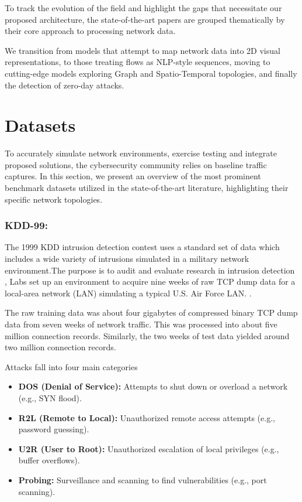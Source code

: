 \documentclass[12pt, a4paper]{report}
\begin{document}
To track the evolution of the field and highlight the gaps that necessitate our proposed architecture, the state-of-the-art papers are grouped thematically by their core approach to processing network data. 

We transition from models that attempt to map network data into 2D visual representations, to those treating flows as NLP-style sequences, moving to cutting-edge models exploring Graph and Spatio-Temporal topologies, and finally the detection of zero-day attacks.

\section{Datasets}

 To accurately simulate network environments, exercise  testing  and  integrate proposed solutions, the cybersecurity community relies on baseline traffic captures. 
 In this section, we present an overview of the most prominent benchmark datasets utilized in the state-of-the-art literature, highlighting their specific network topologies.


\subsubsection{KDD-99:}

  The 1999 KDD intrusion detection contest uses a standard set of data \cite{kddcup99} which includes a wide variety of intrusions simulated in a military network environment.The purpose is to audit  and evaluate research in intrusion detection ,
  Labs set up an environment to acquire nine weeks of raw TCP dump data for a local-area network (LAN) simulating a typical U.S. Air Force LAN. .

The raw training data was about four gigabytes of compressed binary TCP dump data from seven weeks of network traffic.  This was processed into about five million connection records.  Similarly, the two weeks of test data yielded around two million connection records.


Attacks fall into four main categories

\begin{itemize}
    \item \textbf{DOS (Denial of Service):} Attempts to shut down or overload a network (e.g., SYN flood).
    \item \textbf{R2L (Remote to Local):} Unauthorized remote access attempts (e.g., password guessing).
    \item \textbf{U2R (User to Root):} Unauthorized escalation of local privileges (e.g., buffer overflows).
    \item \textbf{Probing:} Surveillance and scanning to find vulnerabilities (e.g., port scanning).
\end{itemize}
\end{document}
